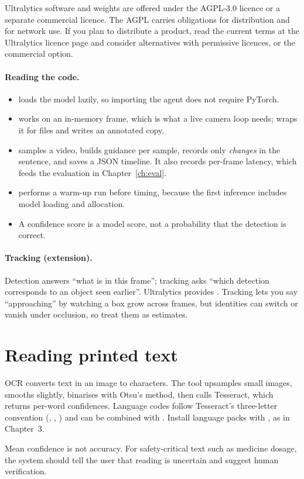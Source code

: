 \begin{warnbox}[Licensing]
Ultralytics software and weights are offered under the AGPL-3.0 licence or a separate commercial licence. The AGPL carries obligations for distribution and for network use. If you plan to distribute a product, read the current terms at the Ultralytics licence page and consider alternatives with permissive licences, or the commercial option.
\end{warnbox}



\paragraph{Reading the code.}
\begin{itemize}
  \item {} loads the model lazily, so importing the agent does not require PyTorch.
  \item {} works on an in-memory frame, which is what a live camera loop needs;  wraps it for files and writes an annotated copy.
  \item {} samples a video, builds guidance per sample, records only \emph{changes} in the sentence, and saves a JSON timeline. It also records per-frame latency, which feeds the evaluation in Chapter~\ref{ch:eval}.
  \item {} performs a warm-up run before timing, because the first inference includes model loading and allocation.
  \item A confidence score is a model score, not a probability that the detection is correct.
\end{itemize}

\paragraph{Tracking (extension).} Detection answers ``what is in this frame''; tracking asks ``which detection corresponds to an object seen earlier''. Ultralytics provides . Tracking lets you say ``approaching'' by watching a box grow across frames, but identities can switch or vanish under occlusion, so treat them as estimates.

\section{Reading printed text}
OCR converts text in an image to characters. The tool upsamples small images, smooths slightly, binarises with Otsu's method, then calls Tesseract, which returns per-word confidences. Language codes follow Tesseract's three-letter convention (, , ) and can be combined with \code{+}. Install language packs with , as in Chapter~3.

Mean confidence is not accuracy. For safety-critical text such as medicine dosage, the system should tell the user that reading is uncertain and suggest human verification.

